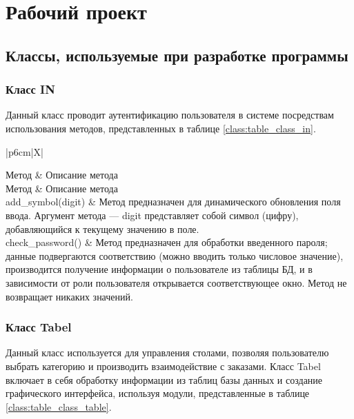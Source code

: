 \section{Рабочий проект}
\subsection{Классы, используемые при разработке программы}

\subsubsection{Класс IN}

Данный класс проводит аутентификацию пользователя в системе посредствам использования методов, представленных в таблице \ref{class:table_class_in}.

\begin{xltabular}{\textwidth}{|p{6cm}|X|}
	\caption{Таблица методов класса IN\label{class:table_class_in}} \hline
	\centrow Метод & \centrow Описание метода \\ \hline
	\endfirsthead
	  \hline
	\centrow Метод & \centrow Описание метода \\ \hline
	\finishhead
	add\_symbol(digit) & Метод предназначен для динамического обновления поля ввода. Аргумент метода — digit представляет собой символ (цифру), добавляющийся к текущему значению в поле. \\ \hline
	check\_password() & Метод предназначен для обработки введенного пароля; данные подвергаются соответствию (можно вводить только числовое значение), производится получение информации о пользователе из таблицы БД, и в зависимости от роли пользователя открывается соответствующее окно. Метод не возвращает никаких значений. \\ \hline
\end{xltabular}

\subsubsection{Класс Tabel}

Данный класс используется для управления столами, позволяя пользователю выбрать категорию и производить взаимодействие с заказами. Класс Tabel включает в себя обработку информации из таблиц базы данных и создание графического интерфейса, используя модули, представленные в таблице \ref{class:table_class_table}.

